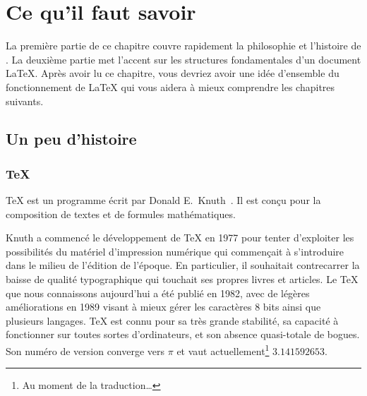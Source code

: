 


\chapter{Ce qu'il faut savoir}
\thispagestyle{plain}

\begin{intro}
La première partie de ce chapitre couvre rapidement la philosophie et
l'histoire de \LaTeXe{}. La
deuxième partie met l'accent sur les structures fondamentales d'un
document \LaTeX{}. Après avoir lu ce chapitre, vous devriez avoir une
idée d'ensemble du fonctionnement de \LaTeX{} qui vous aidera à
mieux comprendre les chapitres suivants.
\end{intro}

\section{Un peu d'histoire}

\subsection{\TeX}

\TeX{} est un programme écrit par Donald
E.~Knuth~\cite{texbook}.  Il est conçu pour la composition de textes
et de formules mathématiques.

Knuth a commencé le développement de \TeX{} en 1977 pour tenter
d'exploiter les possibilités du matériel d'impression numérique qui commençait
à s'introduire dans le milieu de l'édition de l'époque. En particulier, il
souhaitait contrecarrer la baisse de qualité typographique qui touchait ses
propres livres et articles. Le \TeX{} que nous connaissons aujourd'hui a été
publié en 1982, avec de légères améliorations en 1989 visant à mieux gérer les
caractères 8 bits ainsi que plusieurs langages. \TeX{} est connu pour sa très
grande stabilité, sa capacité à fonctionner sur toutes sortes d'ordinateurs,
et son absence quasi-totale de bogues. Son numéro de version converge vers
$\pi$ et vaut actuellement\footnote{Au moment de la traduction\dots \NdT}
$3.141592653$.


